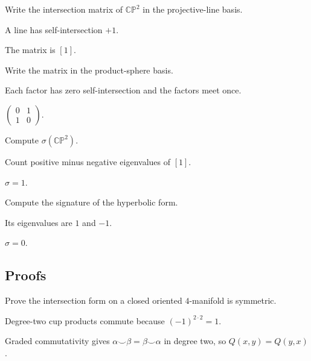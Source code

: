 \begin{exercise}[CP2 matrix]\label{exr:viii34-ped-02}
Write the intersection matrix of $\mathbb{CP}^2$ in the projective-line basis.
\end{exercise}
\begin{hint}
A line has self-intersection $+1$.
\end{hint}
\begin{solution}
The matrix is $[1]$.
\end{solution}

\begin{exercise}[S2xS2 matrix]\label{exr:viii34-ped-03}
Write the matrix in the product-sphere basis.
\end{exercise}
\begin{hint}
Each factor has zero self-intersection and the factors meet once.
\end{hint}
\begin{solution}
$\begin{pmatrix}0&1\\1&0\end{pmatrix}$.
\end{solution}

\begin{exercise}[Signature of CP2]\label{exr:viii34-ped-04}
Compute $\sigma(\mathbb{CP}^2)$.
\end{exercise}
\begin{hint}
Count positive minus negative eigenvalues of $[1]$.
\end{hint}
\begin{solution}
$\sigma=1$.
\end{solution}

\begin{exercise}[Signature of S2xS2]\label{exr:viii34-ped-05}
Compute the signature of the hyperbolic form.
\end{exercise}
\begin{hint}
Its eigenvalues are $1$ and $-1$.
\end{hint}
\begin{solution}
$\sigma=0$.
\end{solution}

\subsection*{Proofs}

\begin{exercise}[Symmetry]\label{exr:viii34-ped-06}
Prove the intersection form on a closed oriented $4$-manifold is symmetric.
\end{exercise}
\begin{hint}
Degree-two cup products commute because $(-1)^{2\cdot2}=1$.
\end{hint}
\begin{solution}
Graded commutativity gives $\alpha\smile\beta=\beta\smile\alpha$ in degree two, so $Q(x,y)=Q(y,x)$.
\end{solution}

